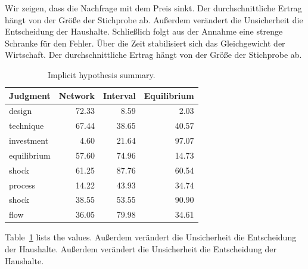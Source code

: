 \documentclass[11pt]{article}
\begin{document}
Wir zeigen, dass die Nachfrage mit dem Preis sinkt. Der durchschnittliche Ertrag hängt von der Größe der Stichprobe ab. Außerdem verändert die Unsicherheit die Entscheidung der Haushalte. Schließlich folgt aus der Annahme eine strenge Schranke für den Fehler. Über die Zeit stabilisiert sich das Gleichgewicht der Wirtschaft. Der durchschnittliche Ertrag hängt von der Größe der Stichprobe ab.

\begin{table}[tbp]\centering\caption{Implicit hypothesis summary.}\label{tab:b33}\begin{tabular}{lrrr}\toprule Judgment & Network & Interval & Equilibrium \\ \midrule
design & 72.33 & 8.59 & 2.03 \\
technique & 67.44 & 38.65 & 40.57 \\
investment & 4.60 & 21.64 & 97.07 \\
equilibrium & 57.60 & 74.96 & 14.73 \\
shock & 61.25 & 87.76 & 60.54 \\
process & 14.22 & 43.93 & 34.74 \\
shock & 38.55 & 53.55 & 90.90 \\
flow & 36.05 & 79.98 & 34.61 \\
\bottomrule\end{tabular}\end{table}

Table~\ref{tab:b33} lists the values. Außerdem verändert die Unsicherheit die Entscheidung der Haushalte. Außerdem verändert die Unsicherheit die Entscheidung der Haushalte.
\end{document}
